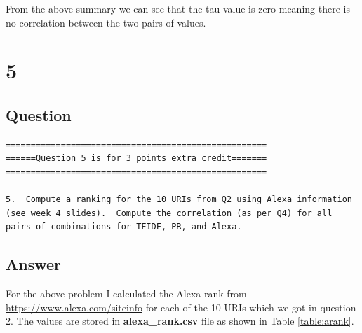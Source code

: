 \documentclass[letterpaper,11pt]{article}
\begin{document}
From  the above summary we can see that the tau value is zero meaning there is no correlation between the two pairs of values.

\clearpage


\section*{5}

\subsection*{Question}

\begin{verbatim}
====================================================
======Question 5 is for 3 points extra credit=======
====================================================

5.  Compute a ranking for the 10 URIs from Q2 using Alexa information
(see week 4 slides).  Compute the correlation (as per Q4) for all
pairs of combinations for TFIDF, PR, and Alexa.

\end{verbatim}

\clearpage
\subsection*{Answer}

For the above problem I calculated the Alexa rank from \url{https://www.alexa.com/siteinfo} for each of the 10 URIs which we got in question 2. The values are stored in \textbf{alexa\_rank.csv} file as shown in Table \ref{table:arank}.
\end{document}
